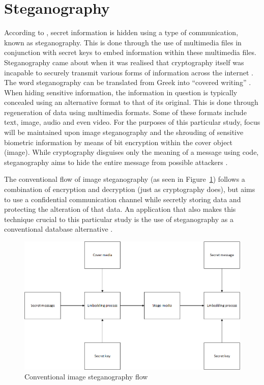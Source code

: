 \section[Steganography]{Steganography}
According to \cite{Kishor2016}, secret information is hidden using a type of communication, known as steganography. This is done through the use of multimedia files in conjunction with secret keys to embed information within these multimedia files. Steganography came about when it was realised that cryptography itself was incapable to securely transmit various forms of information across the internet \citep{Jain2016}. The word steganography can be translated from Greek into “covered writing” \citep{Pandit2016}. When hiding sensitive information, the information in question is typically concealed using an alternative format to that of its original. This is done through regeneration of data using multimedia formats. Some of these formats include text, image, audio and even video. For the purposes of this particular study, focus will be maintained upon image steganography and the shrouding of sensitive biometric information by means of bit encryption within the cover object (image). While cryptography disguises only the meaning of a message using code, steganography aims to hide the entire message from possible attackers \citep{Kishor2016, Pradhan2016}.

The conventional flow of image steganography (as seen in Figure~\ref{fig:Conventional image steganography flow}) follows a combination of encryption and decryption (just as cryptography does), but aims to use a confidential communication channel while secretly storing data and protecting the alteration of that data. An application that also makes this technique crucial to this particular study is the use of steganography as a conventional database alternative \citep{Pandit2016}.


  
\begin{figure}[htbp!] 
\centering    
\includegraphics[width=1.0\textwidth]{Chapter2/Figs/Figure2-4.png}
\caption[Conventional image steganography flow]{Conventional image steganography flow}
\label{fig:Conventional image steganography flow}
\end{figure}

